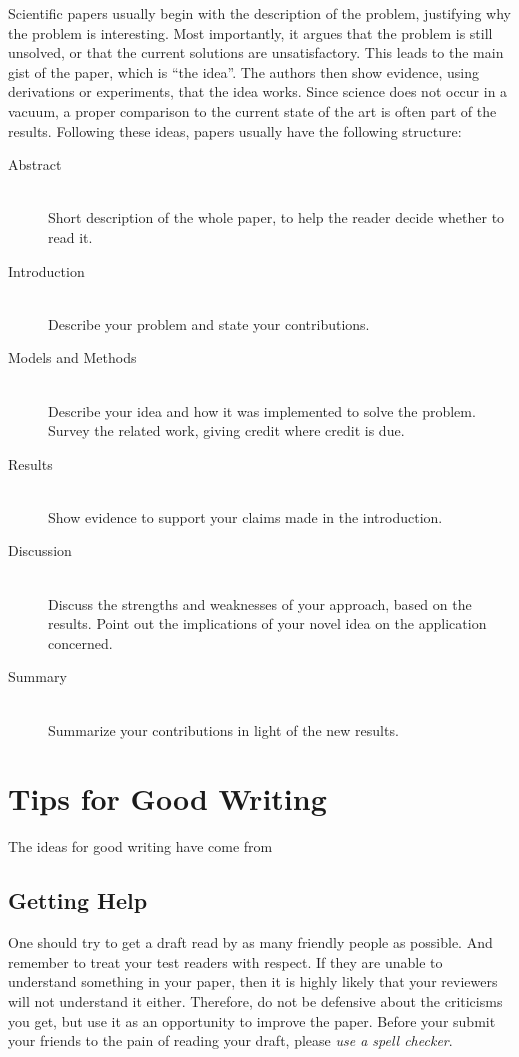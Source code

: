 \documentclass[10pt,conference,compsocconf]{IEEEtran}
\begin{document}
Scientific papers usually begin with the description of the problem,
justifying why the problem is interesting. Most importantly, it argues
that the problem is still unsolved, or that the current solutions are
unsatisfactory. This leads to the main gist of the paper, which is
``the idea''. The authors then show evidence, using derivations or
experiments, that the idea works. Since science does not occur in a
vacuum, a proper comparison to the current state of the art is often
part of the results. Following these ideas, papers usually have the
following structure:
\begin{description}
\item[Abstract] \ \\
  Short description of the whole paper, to help the
  reader decide whether to read it.
\item[Introduction] \ \\
  Describe your problem and state your
  contributions.
\item[Models and Methods] \ \\
  Describe your idea and how it was implemented to solve
  the problem. Survey the related work, giving credit where credit is
  due.
\item[Results] \ \\
  Show evidence to support your claims made in the
  introduction.
\item[Discussion] \ \\
  Discuss the strengths and weaknesses of your
  approach, based on the results. Point out the implications of your
  novel idea on the application concerned.
\item[Summary] \ \\
  Summarize your contributions in light of the new
  results.
\end{description}


\section{Tips for Good Writing}
\label{sec:tips-writing}

The ideas for good writing have come
from~

\subsection{Getting Help}
One should try to get a draft read by as many friendly people as
possible. And remember to treat your test readers with respect. If
they are unable to understand something in your paper, then it is
highly likely that your reviewers will not understand it
either. Therefore, do not be defensive about the criticisms you get,
but use it as an opportunity to improve the paper. Before your submit
your friends to the pain of reading your draft, please \emph{use a
  spell checker}.
\end{document}
